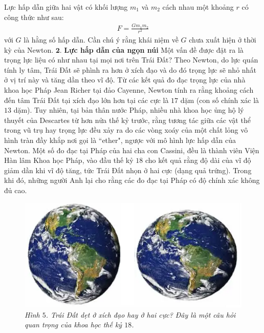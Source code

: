 \begin{multicols}{2}
	\vskip 0.1cm
	Lực hấp dẫn giữa hai vật có khối lượng $m_1$ và $m_2$ cách nhau một khoảng $r$ có công thức như sau:
	\begin{align*}
		F =\frac{Gm_1m_2}{r^2}
	\end{align*}
	với $G$ là hằng số hấp dẫn. Cần chú ý rằng khái niệm về $G$ chưa xuất hiện ở thời kỳ của Newton.
	\vskip 0.1cm
	$\pmb{2.}$ \textbf{\color{timhieukhoahoc}Lực hấp dẫn của ngọn núi}
	\vskip 0.1cm
	Một vấn đề được đặt ra là trọng lực liệu có như nhau tại mọi nơi trên Trái Đất? Theo Newton, do lực quán tính ly tâm, Trái Đất sẽ phình ra hơn ở xích đạo và do đó trọng lực sẽ nhỏ nhất ở vị trí này và tăng dần theo vĩ độ. Từ các kết quả đo đạc trọng lực của nhà khoa học Pháp Jean Richer tại đảo Cayenne, Newton tính ra rằng khoảng cách đến tâm Trái Đất tại xích đạo lớn hơn tại các cực là $17$ dặm (con số chính xác là $13$ dặm).
	\vskip 0.1cm
	Tuy nhiên, tại bản thân nước Pháp, nhiều nhà khoa học ủng hộ lý thuyết của Descartes từ hơn nửa thế kỷ trước, rằng tương tác giữa các vật thể trong vũ trụ hay trọng lực đều xảy ra do các vòng xoáy của một chất lỏng vô hình tràn đầy khắp nơi gọi là ``ether", ngược với mô hình lực hấp dẫn của Newton. Một số đo đạc tại Pháp của hai cha con Cassini, đều là thành viên Viện Hàn lâm Khoa học Pháp, vào đầu thế kỷ $18$ cho kết quả rằng độ dài của vĩ độ giảm dần khi vĩ độ tăng, tức Trái Đất nhọn ở hai cực (dạng quả trứng). Trong khi đó, những người Anh lại cho rằng các đo đạc tại Pháp có độ chính xác không đủ cao.
	\begin{figure}[H]
		\vspace*{-6pt}
		\centering
		\captionsetup{labelformat= empty, justification=centering}
		\includegraphics[width =1\linewidth]{5}
		\caption{\small\textit{\color{timhieukhoahoc}Hình $5$. Trái Đất dẹt ở xích đạo hay ở hai cực? Đây là một câu hỏi quan trọng của khoa học thế kỷ $18$.}}
		\vspace*{-10pt}

\end{figure}
\end{multicols}

